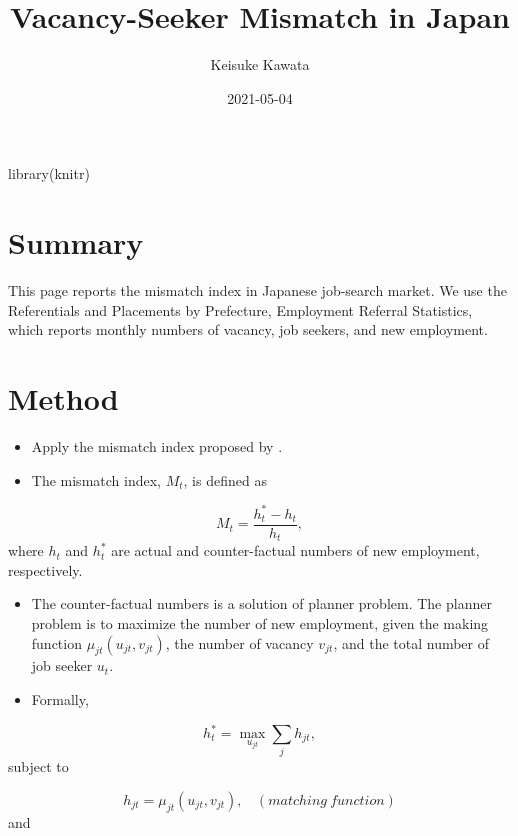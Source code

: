 \documentclass[
]{book}
\title{Vacancy-Seeker Mismatch in Japan}
\author{Keisuke Kawata}
\date{2021-05-04}
\newenvironment{Shaded}{\begin{snugshade}}{\end{snugshade}}
\newcommand{\FunctionTok}[1]{\textcolor[rgb]{0.00,0.00,0.00}{#1}}
\newcommand{\NormalTok}[1]{#1}
\begin{document}
\maketitle

{
\setcounter{tocdepth}{1}
\tableofcontents
}
\begin{Shaded}
\begin{Highlighting}[]
\FunctionTok{library}\NormalTok{(knitr)}
\end{Highlighting}
\end{Shaded}

\hypertarget{summary}{%
\chapter{Summary}\label{summary}}

This page reports the mismatch index \citep{csahin2014mismatch} in Japanese job-search market.
We use the Referentials and Placements by Prefecture, Employment Referral Statistics, which reports monthly numbers of vacancy, job seekers, and new employment.

\hypertarget{intro}{%
\chapter{Method}\label{intro}}

\begin{itemize}
\item
  Apply the mismatch index proposed by \citet{csahin2014mismatch}.
\item
  The mismatch index, \(M_t\), is defined as
\end{itemize}

\[M_t = \frac{h_t^{*}-h_t}{h_t},\]
where \(h_t\) and \(h_t^*\) are actual and counter-factual numbers of new employment, respectively.

\begin{itemize}
\item
  The counter-factual numbers is a solution of planner problem.
  The planner problem is to maximize the number of new employment, given the making function \(\mu_{jt}(u_{jt},v_{jt})\), the number of vacancy \(v_{jt}\), and the total number of job seeker \(u_{t}\).
\item
  Formally,
\end{itemize}

\[h_t^*=\max_{u_{jt}} \sum_j h_{jt},\]
subject to

\[h_{jt}=\mu_{jt}(u_{jt},v_{jt}),\ \ \ \ (matching\ function)\]
and
\end{document}
